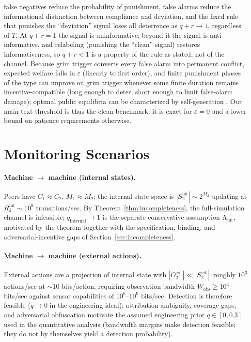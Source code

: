 \documentclass[manuscript,screen,review]{jair}
\begin{document}
false negatives reduce the probability of punishment, false alarms reduce the informational distinction between compliance and deviation, and the fixed rule that punishes the ``deviation'' signal loses all deterrence as $q + r \to 1$, regardless of $T$. At $q + r = 1$ the signal is uninformative; beyond it the signal is anti-informative, and relabeling (punishing the ``clean'' signal) restores informativeness, so $q + r < 1$ is a property of the rule as stated, not of the channel. Because grim trigger converts every false alarm into permanent conflict, expected welfare falls in $\varepsilon$ (linearly to first order), and finite punishment phases of the \citet{green.porter.1984} type can improve on grim trigger whenever some finite duration remains incentive-compatible (long enough to deter, short enough to limit false-alarm damage); optimal public equilibria can be characterized by self-generation \cite{abreu.1990,fudenberg.1994}. Our main-text threshold is thus the clean benchmark: it is exact for $\varepsilon = 0$ and a lower bound on patience requirements otherwise.

\section{Monitoring Scenarios}
\label{app:scenarios}

\paragraph{Machine $\to$ machine (internal states).}
Peers have $C_1 \approx C_2$, $M_1 \approx M_2$; the internal state space is $|S^{\mathrm{int}}_2| \sim 2^{M_2}$ updating at $R^{\mathrm{int}}_2 \sim 10^9$ transitions/sec. By Theorem~\ref{thm:incompleteness}, the full-simulation channel is infeasible; $q_{\mathrm{internal}} \to 1$ is the separate conservative assumption A$_{\mathrm{int}}$, motivated by the theorem together with the specification, binding, and adversarial-incentive gaps of Section~\ref{sec:incompleteness}.

\paragraph{Machine $\to$ machine (external actions).}
External actions are a projection of internal state with $|O^{\mathrm{ext}}_2| \ll |S^{\mathrm{int}}_2|$: roughly $10^3$ actions/sec at ${\sim}10$ bits/action, requiring observation bandwidth $W_{\mathrm{obs}} \geq 10^4$ bits/sec against sensor capabilities of $10^6$--$10^9$ bits/sec. Detection is therefore feasible ($q \to 0$ in the engineering ideal); attribution ambiguity, coverage gaps, and adversarial obfuscation motivate the assumed engineering prior $q \in [0, 0.3]$ used in the quantitative analysis (bandwidth margins make detection feasible; they do not by themselves yield a detection probability).
\end{document}
